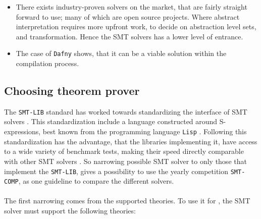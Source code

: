 \begin{itemize}
    \item There exists industry-proven solvers on the market, that are fairly straight forward
          to use; many of which are open source projects. Where abstract interpretation requires
          more upfront work, to decide on
          abstraction level sets, and transformation. Hence the SMT solvers has a lower level
          of entrance.

    \item The case of \texttt{Dafny} shows, that it can be a viable solution within the compilation
          process.
\end{itemize}


\subsection{Choosing theorem prover }
The \texttt{SMT-LIB} standard has worked towards standardizing the interface of SMT solvers \cite{smtlib}.
This standardization include a language constructed around S-expressions, best known from
the programming language \texttt{Lisp} \cite{pld}. Following this standardization has
the advantage, that the libraries implementing it, have access to a wide variety of benchmark tests,
making their speed directly comparable with other SMT solvers \cite{smtlib}. So narrowing possible
SMT solver to only those that implement the \texttt{SMT-LIB}, gives a possibility to use the
yearly competition \texttt{SMT-COMP}, as one guideline to compare the different solvers.
\\
\\
The first narrowing comes from the supported theories. To use it for \lan, the SMT solver must
support the following theories:

